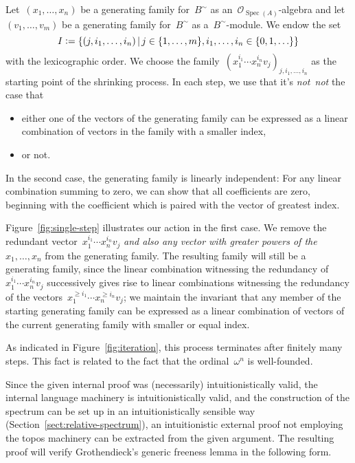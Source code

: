 \documentclass[10pt,reqno,a4paper]{amsbook}
\makeatletter
\theoremstyle{definition}
\theoremstyle{plain}
\theoremstyle{remark}
\renewcommand{\O}{\mathcal{O}}
\DeclareMathOperator{\Spec}{Spec}
\newcommand{\?}{\,{:}\,}
\renewcommand{\_}{\mathpunct{.}\,}
\newcommand{\notnot}{\emph{not~not}\xspace}
\newcommand{\defeq}{\vcentcolon=}
\renewenvironment{proof}[1][\proofname]{\par
  \pushQED{\qed}%
  \normalfont \topsep6\p@\@plus6\p@\relax
  \trivlist
  \item[\hskip\labelsep
        \itshape
    #1\@addpunct{.}]\ignorespaces
}{%
  \popQED\endtrivlist\@endpefalse
}
\makeatother
\begin{document}
\begin{proof}[Proof of Theorem~\ref{thm:generic-freeness}]
Let~$(x_1,\ldots,x_n)$ be a generating family for~$B^\sim$ as
an~$\O_{\Spec(A)}$-algebra and let $(v_1,\ldots,v_m)$ be a generating
family for~$B^\sim$ as a~$B^\sim$-module. We endow the set
\[ I \defeq \{ (j, i_1,\ldots,i_n) \,|\,
  j \in \{ 1,\ldots,m \},
  i_1,\ldots,i_n \in \{ 0,1,\ldots \} \} \]
with the lexicographic order. We choose the family~$(x_1^{i_1} \cdots x_n^{i_n}
v_j)_{j,i_1,\ldots,i_n}$ as the starting point of the shrinking process. In
each step, we use that it's \notnot the case that
\begin{itemize}
\item either one of the vectors of the generating family can be expressed as a
linear combination of vectors in the family with a smaller index,
\item or not.
\end{itemize}

In the second case, the generating family is linearly independent: For any
linear combination summing to zero, we can show that all coefficients are zero,
beginning with the coefficient which is paired with the vector of greatest
index.

Figure~\ref{fig:single-step} illustrates our action in the first case. We remove the redundant vector~$x_1^{i_1} \cdots x_n^{i_n}
v_j$ \emph{and also any vector with greater powers of the~$x_1,\ldots,x_n$}
from the generating family. The resulting family will still be a generating
family, since the linear combination witnessing the redundancy of~$x_1^{i_1}
\cdots x_n^{i_n} v_j$ successively gives rise to linear combinations witnessing
the redundancy of the vectors~$x_1^{\geq i_1} \cdots x_n^{\geq i_n} v_j$;
we maintain the invariant that any member of the starting generating family can
be expressed as a linear combination of vectors of the current generating
family with smaller or equal index.

As indicated in Figure~\ref{fig:iteration}, this process terminates after
finitely many steps. This fact is related to the fact that the ordinal~$\omega^n$ is
well-founded.
\end{proof}

Since the given internal proof was (necessarily) intuitionistically valid, the
internal language machinery is intuitionistically valid, and the construction
of the spectrum can be set up in an intuitionistically sensible way
(Section~\ref{sect:relative-spectrum}), an intuitionistic external proof not
employing the topos machinery can be extracted from the given argument.
The resulting proof will verify Grothendieck's generic freeness lemma in the
following form.
\end{document}
